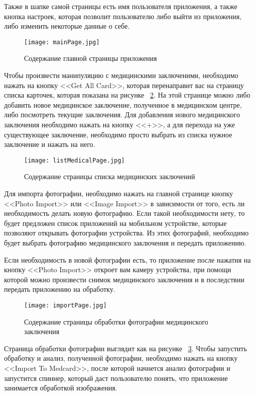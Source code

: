 Также в шапке самой страницы есть имя пользователя приложения, а также кнопка настроек, которая позволит пользователю либо выйти из приложения, либо изменить некоторые данные о себе.

\begin{figure}[ht]
\centering
  \texttt{[image: mainPage.jpg]}  
  \caption{ Содержание главной страницы приложения }
  \label{fig:inst:page:main}
\end{figure}

Чтобы произвести манипуляцию с медицинскими заключеними, необходимо нажать на кнопку <<Get All Card>>, которая перенаправит вас на страницу списка карточек, которая показана на рисунке ~\ref{fig:inst:page:listMedical}. На этой странице можно либо добавить новое медицинское заключение, полученное в медицинском центре, либо посмотреть текущие заключения. Для добавления нового медицинского заключения необходимо нажать на кнопку <<+>>, а для перехода на уже существующее заключение, необходимо просто выбрать из списка нужное заключение и нажать на него.

\begin{figure}[ht]
\centering
  \texttt{[image: listMedicalPage.jpg]}  
  \caption{ Содержание страницы списка медицинских заключений }
  \label{fig:inst:page:listMedical}
\end{figure}

Для импорта фотографии, необходимо нажать на главной странице кнопку <<Photo Import>> или <<Image Import>> в зависимости от того, есть ли необходимость делать новую фотографию. Если такой необходимости нету, то будет предложен список приложений на мобильном устройстве, которые позволяют открывать фотографии устройства. Из этих фотографий, необходимо будет выбрать фотографию медицинского заключения и передать приложению.

Если необходимость в новой фотографии есть, то приложение после нажатия на кнопку <<Photo Import>> откроет вам камеру устройства, при помощи которой можно произвести снимок медицинского заключения и в последствии передать приложению на обработку.
\begin{figure}[ht]
\centering
  \texttt{[image: importPage.jpg]}  
  \caption{ Содержание страницы обработки фотографии медицинского заключения }
  \label{fig:inst:page:importMedical}
\end{figure}
Страница обработки фотографии выглядит как на рисунке ~\ref{fig:inst:page:importMedical}. Чтобы запустить обработку и анализ, полученной фотографии, необходимо нажать на кнопку <<Import To Medcard>>, после которой начнется анализ фотографии и запустится спиннер, который даст пользователю понять, что приложение занимается обработкой изображения.
